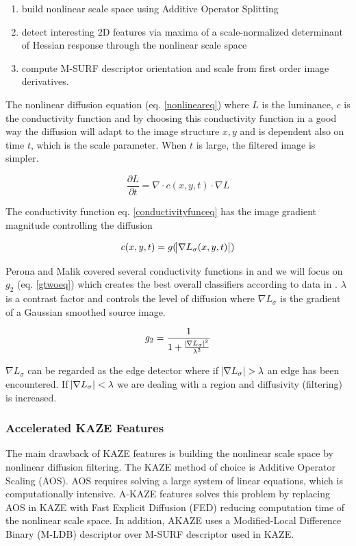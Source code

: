 \documentclass[english,12pt,a4paper,pdftex,elec,utf8]{aaltothesis}
\begin{document}
\begin{enumerate}
\item build nonlinear scale space using Additive Operator Splitting
\item detect interesting 2D features via maxima of a scale-normalized determinant of Hessian response through the nonlinear scale space
\item compute M-SURF descriptor orientation and scale from first order image derivatives.
\end{enumerate}

The nonlinear diffusion equation (eq. \ref{nonlineareq}) where $L$ is the luminance, $c$ is the conductivity function and by choosing this conductivity function in a good way the diffusion will adapt to the image structure $x, y$ and is dependent also on time $t$, which is the scale parameter. When $t$ is large, the filtered image is simpler. \cite{Alcantarilla2013}

\begin{equation}
  \label{nonlineareq}
  \frac{\partial L}{\partial t} = \nabla \cdot c(x,y,t)\cdot\nabla L
\end{equation}
\cite{Alcantarilla2012}

The conductivity function eq. \ref{conductivityfunceq} has the image gradient magnitude controlling the diffusion

\begin{equation}
  \label{conductivityfunceq}
c(x,y,t)=g(\abs{\nabla L_\sigma(x,y,t)})
\end{equation}

Perona and Malik covered several conductivity functions in \cite{Perona1990} and we will focus on $g_2$ (eq. \ref{gtwoeq}) which creates the best overall classifiers according to data in \cite{Alcantarilla2012}. $\lambda$ is a contrast factor and controls the level of diffusion where $\nabla L_{\sigma}$ is the gradient of a Gaussian smoothed source image.

\begin{equation}
  \label{gtwoeq}
g_2 = \frac{1}{1 + \frac{\abs{\nabla L_\sigma}^{2}}{\lambda^{2}}}
\end{equation}

$\nabla L_{\sigma}$ can be regarded as the edge detector where if $\abs{\nabla L_{\sigma}} > \lambda$ an edge has been encountered. If $\abs{\nabla L_{\sigma}} < \lambda$ we are dealing with a region and diffusivity (filtering) is increased. \cite{Weickert1998}


\subsubsection{Accelerated KAZE Features}
The main drawback of KAZE features is building the nonlinear scale space by nonlinear diffusion filtering.  The KAZE method of choice is Additive Operator Scaling (AOS). AOS requires solving a large system of linear equations, which is computationally intensive. A-KAZE features solves this problem by replacing AOS in KAZE with Fast Explicit Diffusion (FED) reducing computation time of the nonlinear scale space. In addition, AKAZE uses a Modified-Local Difference Binary (M-LDB) descriptor over M-SURF descriptor used in KAZE.
\end{document}
